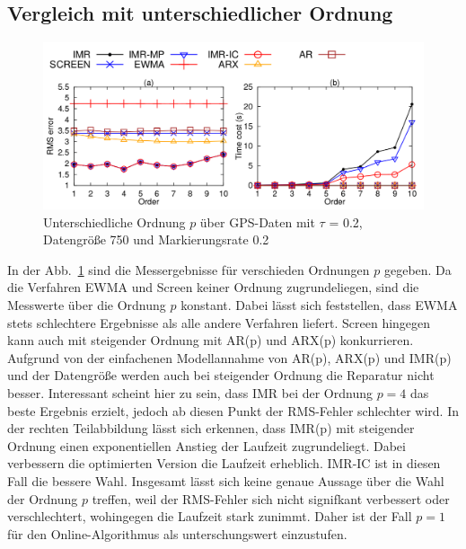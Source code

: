 \subsection{Vergleich mit unterschiedlicher Ordnung}
\begin{figure}[htbp]
    \centering
    \includegraphics[width=\textwidth]{../plots/varying_order_p.png}
    \caption{Unterschiedliche Ordnung $p$ über GPS-Daten mit $\tau$ = 0.2, Datengröße 750 und Markierungsrate 0.2}%
    \label{varying_order_p}
\end{figure}

In der Abb.~\ref{varying_order_p} sind die Messergebnisse für verschieden
Ordnungen $p$ gegeben. Da die Verfahren EWMA und Screen keiner Ordnung
zugrundeliegen, sind die Messwerte über die Ordnung $p$ konstant. Dabei lässt
sich feststellen, dass EWMA stets schlechtere Ergebnisse als alle andere
Verfahren liefert. Screen hingegen kann auch mit steigender Ordnung mit AR(p)
und ARX(p) konkurrieren. Aufgrund von der einfachenen Modellannahme von AR(p),
ARX(p) und IMR(p) und der Datengröße werden auch bei steigender Ordnung die
Reparatur nicht besser. Interessant scheint hier zu sein, dass IMR bei der
Ordnung $p=4$ das beste Ergebnis erzielt, jedoch ab diesen Punkt der RMS-Fehler
schlechter wird. In der rechten Teilabbildung lässt sich erkennen, dass IMR(p)
mit steigender Ordnung einen exponentiellen Anstieg der Laufzeit zugrundeliegt.
Dabei verbessern die optimierten Version die Laufzeit erheblich. IMR-IC ist in
diesen Fall die bessere Wahl. Insgesamt lässt sich keine genaue Aussage über
die Wahl der Ordnung $p$ treffen, weil der RMS-Fehler sich nicht signifkant
verbessert oder verschlechtert, wohingegen die Laufzeit stark zunimmt. Daher
ist der Fall $p=1$ für den Online-Algorithmus als unterschungswert einzustufen.

